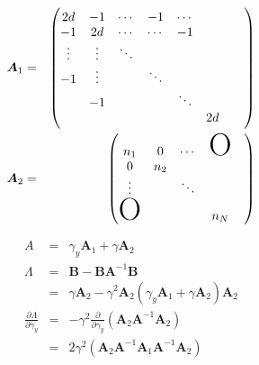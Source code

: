 \documentclass[platex, a4paper]{jsarticle}
\begin{document}
\begin{eqnarray}
  \bm{A}_1 &=&
    \begin{pmatrix}
      2d & -1 & \cdots & -1 & \cdots &\\
      -1 & 2d &\cdots &  \cdots &  -1  &  \\
      \vdots&\vdots& \ddots &&& \\
      -1 &\vdots&& \ddots &&& \\
      & -1 &&& \ddots &&& \\
      &&&&& 2d \\
    \end{pmatrix} \\
  \bm{A}_2  &=&
    \begin{pmatrix}
      n_1 & 0 & \cdots & \mbox{\Huge O}\\
      0 & n_2 & && \\
      \vdots & & \ddots \\
      \mbox{\Huge O}&&& n_N
    \end{pmatrix}
\end{eqnarray}

\begin{eqnarray}
  A &=& \gamma_y \bm{A}_1 + \gamma \bm{A}_2 \\
  \Lambda &=& \bm{B} - \bm{B} \bm{A}^{-1} \bm{B}\\
           &=& \gamma \bm{A}_2 - \gamma^2 \bm{A}_2 (\gamma_y \bm{A}_1 + \gamma \bm{A}_2) \bm{A}_2 \\
  \frac{\partial \Lambda}{\partial \gamma_y} &=& - \gamma^2 \frac{\partial}{\partial \gamma_y}
    \left(\bm{A}_2 \bm{A}^{-1} \bm{A}_2  \right) \\
    &=& 2 \gamma^2  \left(\bm{A}_2 \bm{A}^{-1} \bm{A}_1 \bm{A}^{-1} \bm{A}_2  \right)
\end{eqnarray}
\end{document}
